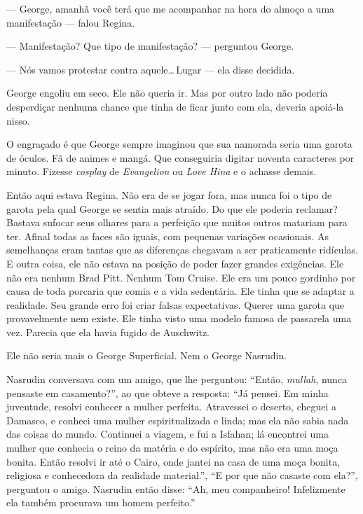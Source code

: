 --- George, amanhã você terá que me acompanhar na hora do almoço a uma manifestação --- falou Regina.

--- Manifestação? Que tipo de manifestação? --- perguntou George.

--- Nós vamos protestar contra aquele\ldots\,Lugar --- ela disse decidida.

George engoliu em seco. Ele não queria ir. Mas\mudanca{,} por outro lado\mudanca{,} não poderia desperdiçar nenhuma chance que tinha de ficar junto com ela, deveria apoiá-la nisso.

O engraçado é que George sempre imaginou que sua namorada seria uma garota de óculos. Fã de animes e mangá. Que conseguiria digitar noventa caracteres por minuto. Fizesse \emph{cosplay}  de \emph{Evangelion} ou \emph{Love Hina} e o achasse demais.

Então aqui estava Regina. Não era de se jogar fora, mas nunca foi o tipo de garota pela qual George se sentia mais atraído. Do que ele poderia reclamar? Bastava sufocar seus olhares para a perfeição que muitos outros matariam para ter. Afinal todas as faces são iguais, com pequenas variações ocasionais. As semelhanças eram tantas que as diferenças chegavam a ser praticamente ridículas. E outra coisa, ele não estava na posição de poder fazer grandes exigências. Ele não era nenhum Brad Pitt. Nenhum Tom Cruise. Ele era um pouco gordinho por causa de toda porcaria que comia e a vida sedentária. Ele tinha que se adaptar a realidade. Seu grande erro foi criar falsas expectativas. Querer uma garota que provavelmente nem existe. Ele tinha visto uma modelo famosa de passarela uma vez. Parecia que ela havia fugido de Auschwitz.

Ele não seria mais o George Superficial. Nem o George Nasrudin.

Nasrudin conversava com um amigo, que lhe perguntou: ``Então, \emph{mullah}, nunca pensaste em casamento?'', ao que obteve a resposta: ``Já pensei. Em minha juventude, resolvi conhecer a mulher perfeita. Atravessei o deserto, cheguei a Damasco, e conheci uma mulher espiritualizada e linda; mas ela não sabia nada das coisas do mundo. Continuei a viagem, e fui a Isfahan; lá encontrei uma mulher que conhecia o reino da matéria e do espírito, mas não era uma moça bonita. Então resolvi ir até o Cairo, onde jantei na casa de uma moça bonita, religiosa e conhecedora da realidade material.'', ``E por que não casaste com ela?'', perguntou o amigo. Nasrudin então disse: ``Ah, meu companheiro! Infelizmente ela também procurava um homem perfeito.''

